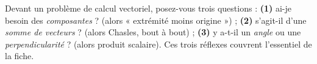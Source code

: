 \documentclass[11pt,a4paper]{article}
\begin{document}
\begin{remarque}
Devant un problème de calcul vectoriel, posez-vous trois questions :
\textbf{(1)} ai-je besoin des \emph{composantes} ? (alors « extrémité moins origine ») ;
\textbf{(2)} s'agit-il d'une \emph{somme de vecteurs} ? (alors Chasles, bout à bout) ;
\textbf{(3)} y a-t-il un \emph{angle} ou une \emph{perpendicularité} ? (alors produit scalaire).
Ces trois réflexes couvrent l'essentiel de la fiche.
\end{remarque}
\end{document}
